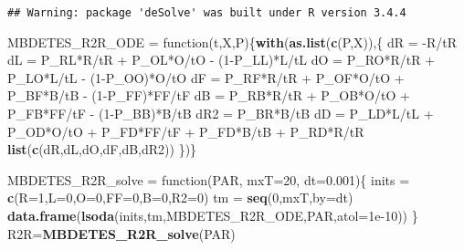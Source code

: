\documentclass[]{article}
\newenvironment{Shaded}{\begin{snugshade}}{\end{snugshade}}
\newcommand{\KeywordTok}[1]{\textcolor[rgb]{0.13,0.29,0.53}{\textbf{{#1}}}}
\newcommand{\DataTypeTok}[1]{\textcolor[rgb]{0.13,0.29,0.53}{{#1}}}
\newcommand{\DecValTok}[1]{\textcolor[rgb]{0.00,0.00,0.81}{{#1}}}
\newcommand{\FloatTok}[1]{\textcolor[rgb]{0.00,0.00,0.81}{{#1}}}
\newcommand{\StringTok}[1]{\textcolor[rgb]{0.31,0.60,0.02}{{#1}}}
\newcommand{\NormalTok}[1]{{#1}}
\begin{document}
\begin{verbatim}
## Warning: package 'deSolve' was built under R version 3.4.4
\end{verbatim}

\begin{Shaded}
\begin{Highlighting}[]
\NormalTok{MBDETES_R2R_ODE =}\StringTok{ }\NormalTok{function(t,X,P)\{}\KeywordTok{with}\NormalTok{(}\KeywordTok{as.list}\NormalTok{(}\KeywordTok{c}\NormalTok{(P,X)),\{}
  \NormalTok{dR =}\StringTok{ }\NormalTok{-R/tR}
  \NormalTok{dL =}\StringTok{ }\NormalTok{P_RL*R/tR +}\StringTok{ }\NormalTok{P_OL*O/tO -}\StringTok{ }\NormalTok{(}\DecValTok{1}\NormalTok{-P_LL)*L/tL}
  \NormalTok{dO =}\StringTok{ }\NormalTok{P_RO*R/tR +}\StringTok{ }\NormalTok{P_LO*L/tL -}\StringTok{ }\NormalTok{(}\DecValTok{1}\NormalTok{-P_OO)*O/tO}
  \NormalTok{dF =}\StringTok{ }\NormalTok{P_RF*R/tR +}\StringTok{ }\NormalTok{P_OF*O/tO +}\StringTok{ }\NormalTok{P_BF*B/tB -}\StringTok{ }\NormalTok{(}\DecValTok{1}\NormalTok{-P_FF)*FF/tF}
  \NormalTok{dB =}\StringTok{ }\NormalTok{P_RB*R/tR +}\StringTok{ }\NormalTok{P_OB*O/tO +}\StringTok{ }\NormalTok{P_FB*FF/tF -}\StringTok{ }\NormalTok{(}\DecValTok{1}\NormalTok{-P_BB)*B/tB}
  \NormalTok{dR2 =}\StringTok{ }\NormalTok{P_BR*B/tB}
  \NormalTok{dD  =}\StringTok{ }\NormalTok{P_LD*L/tL +}\StringTok{ }\NormalTok{P_OD*O/tO +}\StringTok{ }\NormalTok{P_FD*FF/tF +}\StringTok{ }\NormalTok{P_FD*B/tB +}\StringTok{ }\NormalTok{P_RD*R/tR}
  \KeywordTok{list}\NormalTok{(}\KeywordTok{c}\NormalTok{(dR,dL,dO,dF,dB,dR2))}
\NormalTok{\})\}}

\NormalTok{MBDETES_R2R_solve =}\StringTok{ }\NormalTok{function(PAR, }\DataTypeTok{mxT=}\DecValTok{20}\NormalTok{, }\DataTypeTok{dt=}\FloatTok{0.001}\NormalTok{)\{}
  \NormalTok{inits =}\StringTok{ }\KeywordTok{c}\NormalTok{(}\DataTypeTok{R=}\DecValTok{1}\NormalTok{,}\DataTypeTok{L=}\DecValTok{0}\NormalTok{,}\DataTypeTok{O=}\DecValTok{0}\NormalTok{,}\DataTypeTok{FF=}\DecValTok{0}\NormalTok{,}\DataTypeTok{B=}\DecValTok{0}\NormalTok{,}\DataTypeTok{R2=}\DecValTok{0}\NormalTok{)}
  \NormalTok{tm =}\StringTok{ }\KeywordTok{seq}\NormalTok{(}\DecValTok{0}\NormalTok{,mxT,}\DataTypeTok{by=}\NormalTok{dt)}
  \KeywordTok{data.frame}\NormalTok{(}\KeywordTok{lsoda}\NormalTok{(inits,tm,MBDETES_R2R_ODE,PAR,}\DataTypeTok{atol=}\FloatTok{1e-10}\NormalTok{))}
\NormalTok{\}}
\NormalTok{R2R=}\KeywordTok{MBDETES_R2R_solve}\NormalTok{(PAR)}
\end{Highlighting}
\end{Shaded}
\end{document}
